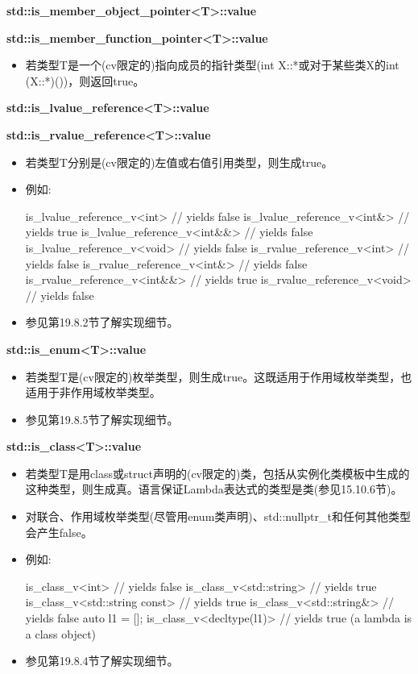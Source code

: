 \textbf{std::is\_member\_object\_pointer<T>::value}

\textbf{std::is\_member\_function\_pointer<T>::value}

\begin{itemize}
\item 
若类型T是一个(cv限定的)指向成员的指针类型(int X::*或对于某些类X的int (X::*)())，则返回true。
\end{itemize}

\textbf{std::is\_lvalue\_reference<T>::value}

\textbf{std::is\_rvalue\_reference<T>::value}

\begin{itemize}
\item 
若类型T分别是(cv限定的)左值或右值引用类型，则生成true。

\item 
例如:
\begin{cpp}
is_lvalue_reference_v<int> // yields false
is_lvalue_reference_v<int&> // yields true
is_lvalue_reference_v<int&&> // yields false
is_lvalue_reference_v<void> // yields false
is_rvalue_reference_v<int> // yields false
is_rvalue_reference_v<int&> // yields false
is_rvalue_reference_v<int&&> // yields true
is_rvalue_reference_v<void> // yields false
\end{cpp}

\item 
参见第19.8.2节了解实现细节。
\end{itemize}

\textbf{std::is\_enum<T>::value}

\begin{itemize}
\item 
若类型T是(cv限定的)枚举类型，则生成true。这既适用于作用域枚举类型，也适用于非作用域枚举类型。

\item 
参见第19.8.5节了解实现细节。
\end{itemize}

\textbf{std::is\_class<T>::value}

\begin{itemize}
\item 
若类型T是用class或struct声明的(cv限定的)类，包括从实例化类模板中生成的这种类型，则生成真。语言保证Lambda表达式的类型是类(参见15.10.6节)。

\item 
对联合、作用域枚举类型(尽管用enum类声明)、std::nullptr\_t和任何其他类型会产生false。

\item 
例如:
\begin{cpp}
is_class_v<int> // yields false
is_class_v<std::string> // yields true
is_class_v<std::string const> // yields true
is_class_v<std::string&> // yields false
auto l1 = []{};
is_class_v<decltype(l1)> // yields true (a lambda is a class object)
\end{cpp}

\item 
参见第19.8.4节了解实现细节。
\end{itemize}

